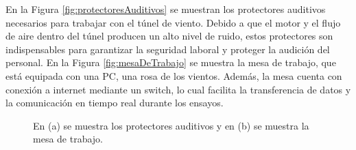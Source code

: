 En la Figura \ref{fig:protectoresAuditivos} se muestran los protectores auditivos necesarios para trabajar con el túnel de viento. Debido a que el motor y el flujo de aire dentro del túnel producen un alto nivel de ruido, estos protectores son indispensables para garantizar la seguridad laboral y proteger la audición del personal. En la Figura \ref{fig:mesaDeTrabajo} se muestra la mesa de trabajo, que está equipada con una PC, una rosa de los vientos. Además, la mesa cuenta con conexión a internet mediante un switch, lo cual facilita la transferencia de datos y la comunicación en tiempo real durante los ensayos.

\begin{figure}[H]
    \centering
    \begin{minipage}[b]{0.45\textwidth}
    \end{minipage}
    \hspace{1em} %
    \begin{minipage}[b]{0.45\textwidth}
    \end{minipage}  
    \caption{En (a) se muestra los protectores auditivos y en (b) se muestra la mesa de trabajo.}
    \label{fig:utensiliosParaTunel}
\end{figure}    

